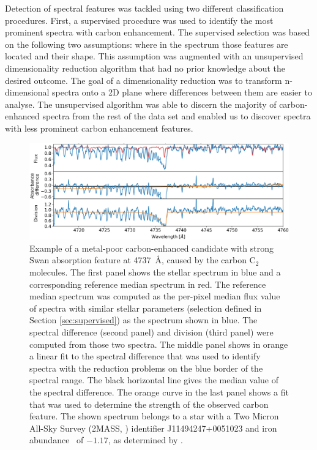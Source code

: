 Detection of spectral features was tackled using two different classification procedures. First, a supervised procedure was used to identify the most prominent spectra with carbon enhancement. The supervised selection was based on the following two assumptions: where in the spectrum those features are located and their shape. This assumption was augmented with an unsupervised dimensionality reduction algorithm that had no prior knowledge about the desired outcome. The goal of a dimensionality reduction was to transform n-dimensional spectra onto a 2D plane where differences between them are easier to analyse. The unsupervised algorithm was able to discern the majority of carbon-enhanced spectra from the rest of the data set and enabled us to discover spectra with less prominent carbon enhancement features.

\begin{figure}
	\centering
	\includegraphics[width=\textwidth]{cemp_cand_150412003601009.png}
	\caption{Example of a metal-poor carbon-enhanced candidate with strong Swan absorption feature at 4737~\AA, caused by the carbon C$_2$ molecules. The first panel shows the stellar spectrum in blue and a corresponding reference median spectrum in red. The reference median spectrum was computed as the per-pixel median flux value of spectra with similar stellar parameters (selection defined in Section \ref{sec:supervised}) as the spectrum shown in blue. The spectral difference (second panel) and division (third panel) were computed from those two spectra. The middle panel shows in orange a linear fit to the spectral difference that was used to identify spectra with the reduction problems on the blue border of the spectral range. The black horizontal line gives the median value of the spectral difference. The orange curve in the last panel shows a fit that was used to determine the strength of the observed carbon feature. The shown spectrum belongs to a star with a Two Micron All-Sky Survey (2MASS, \cite{2006AJ....131.1163S}) identifier J11494247+0051023 and iron abundance \Feh\ of $-1.17$, as determined by \TC.}
	\label{fig:carbon_example}
\end{figure}

